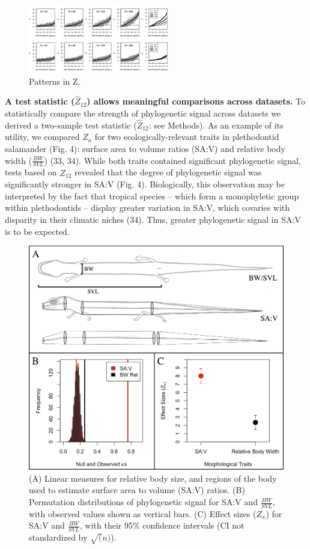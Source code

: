\documentclass[9pt,twocolumn,twoside,lineno]{pnas-new}
\begin{document}
\begin{figure}
\centering
\includegraphics{new.fig.3.temp.png}
\caption{Patterns in Z.{}}
\end{figure}

\textbf{A test statistic (\(\hat{Z}_{12}\)) allows meaningful
comparisons across datasets.} To statistically compare the strength of
phylogenetic signal across datasets we derived a two-sample test
statistic (\(\hat{Z}_{12}\): see Methods). As an example of its utility,
we compared \(Z_{\kappa}\) for two ecologically-relevant traits in
plethodontid salamander (Fig. 4): surface area to volume ratios (SA:V)
and relative body width (\(\frac{BW}{SVL}\)) (33, 34). While both traits
contained significant phylogenetic signal, tests based on
\(\hat{Z}_{12}\) revealed that the degree of phylogenetic signal was
significantly stronger in SA:V (Fig. 4). Biologically, this observation
may be interpreted by the fact that tropical species -- which form a
monophyletic group within plethodontids -- display greater variation in
SA:V, which covaries with disparity in their climatic niches (34). Thus,
greater phylogenetic signal in SA:V is to be expected.

\begin{figure}
\centering
\includegraphics{new.fig.4.png}
\caption{(A) Linear measures for relative body size, and regions of the
body used to estimate surface area to volume (SA:V) ratios. (B)
Permutation distributions of phylogenetic signal for SA:V and
\(\frac{BW}{SVL}\), with observed values shown as vertical bars. (C)
Effect sizes (\(Z_\kappa\)) for SA:V and \(\frac{BW}{SVL}\), with their
95\% confidence intervals (CI not standardized by \(\sqrt(n)\)).{}}
\end{figure}
\end{document}

